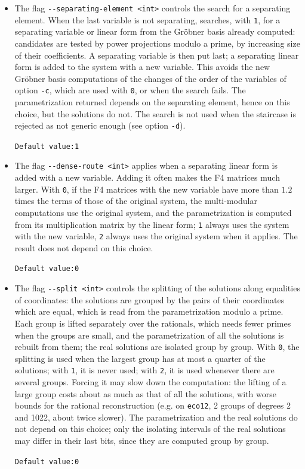 \documentclass[a4paper,english,11pt]{scrartcl}
\theoremstyle{definition}
\theoremstyle{remark}
\begin{document}
\begin{itemize}
\item The flag \verb+--separating-element <int>+ controls the search for a
  separating element. When the last variable is not separating, \msolve
  searches, with \verb+1+, for a separating variable or linear form from
  the Gr\"obner basis already computed: candidates are tested by power
  projections modulo a prime, by increasing size of their coefficients.
  A separating variable is then put last; a separating linear form is
  added to the system with a new variable. This avoids the new
  Gr\"obner basis computations of the changes of the order of the
  variables of option \verb+-c+, which are used with \verb+0+, or when the
  search fails. The parametrization returned depends on the separating
  element, hence on this choice, but the solutions do not. The search is
  not used when the staircase is rejected as not generic enough (see
  option \verb+-d+).

  \hfill \verb+Default value:1+

\item The flag \verb+--dense-route <int>+ applies when a separating linear
  form is added with a new variable. Adding it often makes the F4
  matrices much larger. With \verb+0+, if the F4 matrices with the new
  variable have more than $1.2$ times the terms of those of the original
  system, the multi-modular computations use the original system, and the
  parametrization is computed from its multiplication matrix by the
  linear form; \verb+1+ always uses the system with the new variable,
  \verb+2+ always uses the original system when it applies. The result
  does not depend on this choice.

  \hfill \verb+Default value:0+

\item The flag \verb+--split <int>+ controls the splitting of the solutions
  along equalities of coordinates: the solutions are grouped by the pairs
  of their coordinates which are equal, which is read from the
  parametrization modulo a prime. Each group is lifted separately over the
  rationals, which needs fewer primes when the groups are small, and the
  parametrization of all the solutions is rebuilt from them; the real
  solutions are isolated group by group. With \verb+0+, the splitting is
  used when the largest group has at most a quarter of the solutions;
  with \verb+1+, it is never used; with \verb+2+, it is used whenever there
  are several groups. Forcing it may slow down the computation: the
  lifting of a large group costs about as much as that of all the
  solutions, with worse bounds for the rational reconstruction (e.g. on
  \texttt{eco12}, 2 groups of degrees 2 and 1022, about twice slower). The
  parametrization and the real solutions do not depend on this choice;
  only the isolating intervals of the real solutions may differ in their
  last bits, since they are computed group by group.

  \hfill \verb+Default value:0+
\end{itemize}
\end{document}
